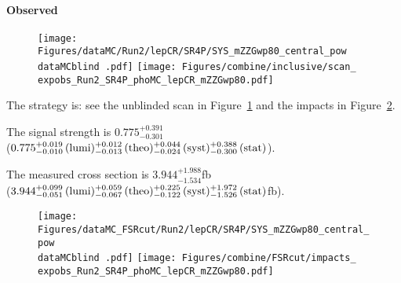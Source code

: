 \label{sec:unblinded_4L_FSRcut}
\paragraph{Observed\\}
\begin{figure}
  \renewcommand{\dataMCblind}{}
  \renewcommand{\expobs}{observed}
  \centering
  \texttt{[image: Figures/dataMC/Run2/lepCR/SR4P/SYS\_mZZGwp80\_central\_pow\\dataMCblind .pdf]}
  \hfill
  \texttt{[image: Figures/combine/inclusive/scan\_\\expobs\_Run2\_SR4P\_phoMC\_lepCR\_mZZGwp80.pdf]}
  \caption{}
  \label{fig:scan_observed_FSRcut_Run2_SR4P}
\end{figure}

The strategy is: see the unblinded scan in Figure~\ref{fig:scan_observed_FSRcut_Run2_SR4P} and the impacts in Figure~\ref{fig:impacts_observed_FSRcut_Run2_SR4P}.

The signal strength is $0.775{}^{+0.391}_{-0.301}$
\\
($0.775{}^{+0.019}_{-0.010}\,\text{(lumi)} {}^{+0.012}_{-0.013}\,\text{(theo)} {}^{+0.044}_{-0.024}\,\text{(syst)} {}^{+0.388}_{-0.300}\,\text{(stat)}$).

The measured cross section is
$3.944{}^{+1.988}_{-1.534}$\usep fb
\\
($3.944{}^{+0.099}_{-0.051}\,\text{(lumi)} {}^{+0.059}_{-0.067}\,\text{(theo)} {}^{+0.225}_{-0.122}\,\text{(syst)} {}^{+1.972}_{-1.526}\,\text{(stat)}$\usep fb).

\begin{figure}
  \renewcommand{\dataMCblind}{}
  \renewcommand{\expobs}{observed}
  \centering
  \texttt{[image: Figures/dataMC\_FSRcut/Run2/lepCR/SR4P/SYS\_mZZGwp80\_central\_pow\\dataMCblind .pdf]}
  \hfill
  \texttt{[image: Figures/combine/FSRcut/impacts\_\\expobs\_Run2\_SR4P\_phoMC\_lepCR\_mZZGwp80.pdf]}
  \caption{}
  \label{fig:impacts_observed_FSRcut_Run2_SR4P}
\end{figure}

